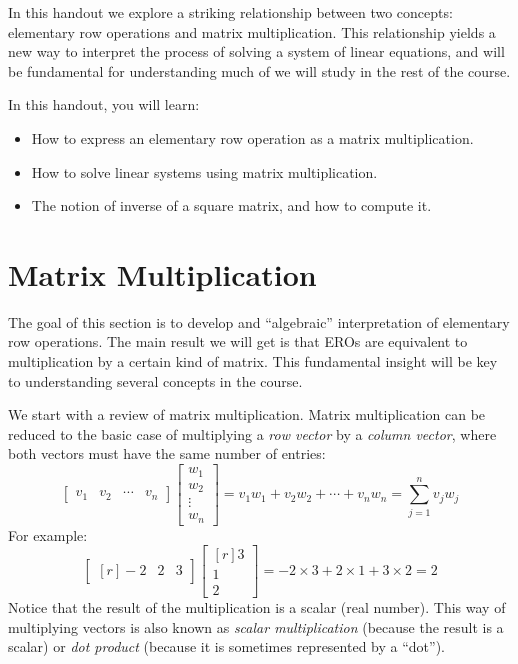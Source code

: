 \documentclass[12pt]{article}
\begin{document}
In this handout we explore a striking relationship between two concepts: elementary row operations and matrix multiplication. This relationship yields a new way to interpret the process of solving a system of linear equations, and will be fundamental for understanding much of we will study in the rest of the course.

In this handout, you will learn:
\begin{itemize}
\item How to express an elementary row operation as a matrix multiplication.
\item How to solve linear systems using matrix multiplication.
\item The notion of inverse of a square matrix, and how to compute it.
\end{itemize}

\section{Matrix Multiplication}

The goal of this section is to develop and ``algebraic'' interpretation of elementary row operations. The main result we will get is that EROs are equivalent to multiplication by a certain kind of matrix. This fundamental insight will be key to understanding several concepts in the course.

We start with a review of matrix multiplication. Matrix multiplication can be reduced to the basic case of multiplying a \emph{row vector} by a \emph{column vector}, where both vectors must have the same number of entries:
\[
\begin{bmatrix}v_1&v_2&\cdots&v_n\end{bmatrix}
\begin{bmatrix}w_1\\w_2\\\vdots\\w_n\end{bmatrix}=
v_1w_1+v_2w_2+\cdots+v_nw_n=\sum_{j=1}^{n}v_jw_j
\]
For example:
\[
\begin{bmatrix*}[r]-2&2&3\end{bmatrix*}
\begin{bmatrix*}[r] 3\\1\\2\end{bmatrix*}=
-2\times3+2\times1+3\times2=2
\]
Notice that the result of the multiplication is a scalar (real number). This way of multiplying vectors is also known as \emph{scalar multiplication} (because the result is a scalar) or \emph{dot product} (because it is sometimes represented by a ``dot'').
\end{document}

